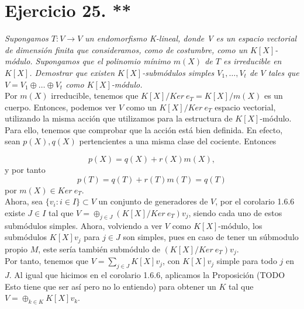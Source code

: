 \section{Ejercicio 25. **}
\textit{Supongamos \(T:V \rightarrow V\) un endomorfismo K-lineal, donde V es un espacio vectorial de dimensión finita que consideramos, como de costumbre, como un \(K[X]\)-módulo. Supongamos que el polinomio mínimo  \(m(X)\) de  \(T\) es irreducible en  \(K[X]\). Demostrar que existen  \(K[X]\)-submódulos simples \(V_1, \dots, V_t\) de \(V\) tales que  \(V = V_1 \oplus \dots \oplus V_t\) como \(K[X]\)-módulo.} \\

Por \(m(X)\) irreducible, tenemos que \(K[X]/Ker\ e_T = K[X]/m(X)\) es un cuerpo. Entonces, podemos ver \(V\) como un \(K[X]/Ker\ e_T\) espacio vectorial, utilizando la misma acción que utilizamos para la estructura de \(K[X]\)-módulo. Para ello, tenemos que comprobar que la acción está bien definida. En efecto, sean \(p(X), q(X)\) pertencientes a una misma clase del cociente. Entonces

\[
p(X) = q(X) + r(X)m(X)
,\]
y por tanto
\[
p(T) = q(T) + r(T)m(T) = q(T)
\]
por \(m(X) \in Ker\ e_T\).\\

Ahora, sea \(\{v_i : i \in I\} \subset V\) un conjunto de generadores de \(V\), por el corolario 1.6.6 existe \(J \in I\) tal que \(V = \oplus_{j \in J} (K[X]/Ker\ e_T)v_j\), siendo cada uno de estos submódulos simples. Ahora, volviendo a ver \(V\) como  \(K[X]\)-módulo, los submódulos \(K[X]v_j\) para \(j \in J\) son simples, pues en caso de tener un súbmodulo propio \(M\), este sería también submódulo de \((K[X]/Ker\ e_T)v_j\).\\

Por tanto, tenemos que \(V = \sum_{j \in J} K[X]v_j\), con \(K[X] v_j\) simple para todo \(j\) en  \(J\). Al igual que hicimos en el corolario 1.6.6, aplicamos la Proposición (TODO Esto tiene que ser así pero no lo entiendo) para obtener un \(K\) tal que  \(V = \oplus_{k \in K}K[X]v_k\).
